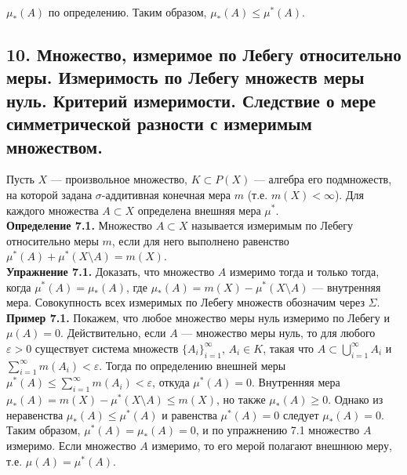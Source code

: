 \documentclass[12pt]{article}
\begin{document}
$\mu_{*}(A)$ по определению. Таким образом, $\mu_{*}(A) \leq \mu^{*}(A)$.

\subsection*{10. Множество, измеримое по Лебегу относительно меры. Измеримость по Лебегу
множеств меры нуль. Критерий измеримости. Следствие о мере симметрической
разности с измеримым множеством.}
Пусть $X$ — произвольное множество, $K \subset P(X)$ — алгебра его подмножеств, на которой задана $\sigma$-аддитивная конечная мера $m$ (т.е. $m(X) < \infty$). Для каждого множества $A \subset X$ определена внешняя мера $\mu^{*}$. \\\textbf{Определение 7.1.} Множество $A \subset X$ называется измеримым по Лебегу относительно меры $m$, если для него выполнено равенство $\mu^{*}(A) + \mu^{*}(X \setminus A) = m(X)$. \\\textbf{Упражнение 7.1.} Доказать, что множество $A$ измеримо тогда и только тогда, когда $\mu^{*}(A) = \mu_{*}(A)$, где $\mu_{*}(A) = m(X) - \mu^{*}(X \setminus A)$ — внутренняя мера. Совокупность всех измеримых по Лебегу множеств обозначим через $\Sigma$.\\\textbf{Пример 7.1.} Покажем, что любое множество меры нуль измеримо по Лебегу и $\mu(A) = 0$. Действительно, если $A$ — множество меры нуль, то для любого $\varepsilon > 0$ существует система множеств $\{A_i\}_{i=1}^\infty$, $A_i \in K$, такая что $A \subset \bigcup_{i=1}^\infty A_i$ и $\sum_{i=1}^\infty m(A_i) < \varepsilon$. Тогда по определению внешней меры $\mu^{*}(A) \leq \sum_{i=1}^\infty m(A_i) < \varepsilon$, откуда $\mu^{*}(A) = 0$. Внутренняя мера $\mu_{*}(A) = m(X) - \mu^{*}(X \setminus A) \leq m(X)$, но также $\mu_{*}(A) \geq 0$. Однако из неравенства $\mu_{*}(A) \leq \mu^{*}(A)$ и равенства $\mu^{*}(A) = 0$ следует $\mu_{*}(A) = 0$. Таким образом, $\mu^{*}(A) = \mu_{*}(A) = 0$, и по упражнению 7.1 множество $A$ измеримо. Если множество $A$ измеримо, то его мерой полагают внешнюю меру, т.е. $\mu(A) = \mu^{*}(A)$.
\end{document}
